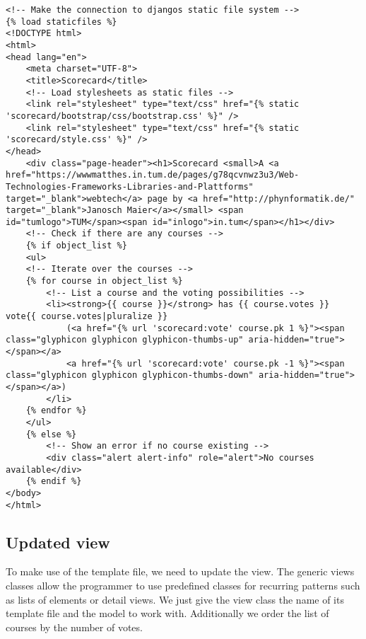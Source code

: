 \begin{lstlisting}[style=HTML, caption=scorecard/templates/scorecard/index.html, label=lst:index.html]
<!-- Make the connection to djangos static file system -->
{% load staticfiles %}
<!DOCTYPE html>
<html>
<head lang="en">
    <meta charset="UTF-8">
    <title>Scorecard</title>
    <!-- Load stylesheets as static files -->
    <link rel="stylesheet" type="text/css" href="{% static 'scorecard/bootstrap/css/bootstrap.css' %}" />
    <link rel="stylesheet" type="text/css" href="{% static 'scorecard/style.css' %}" />
</head>
    <div class="page-header"><h1>Scorecard <small>A <a href="https://wwwmatthes.in.tum.de/pages/g78qcvnwz3u3/Web-Technologies-Frameworks-Libraries-and-Plattforms" target="_blank">webtech</a> page by <a href="http://phynformatik.de/" target="_blank">Janosch Maier</a></small> <span id="tumlogo">TUM</span><span id="inlogo">in.tum</span></h1></div>
    <!-- Check if there are any courses -->
    {% if object_list %}
    <ul>
    <!-- Iterate over the courses -->
    {% for course in object_list %}
        <!-- List a course and the voting possibilities -->
        <li><strong>{{ course }}</strong> has {{ course.votes }} vote{{ course.votes|pluralize }}
            (<a href="{% url 'scorecard:vote' course.pk 1 %}"><span class="glyphicon glyphicon glyphicon-thumbs-up" aria-hidden="true"></span></a>
            <a href="{% url 'scorecard:vote' course.pk -1 %}"><span class="glyphicon glyphicon glyphicon-thumbs-down" aria-hidden="true"></span></a>)
        </li>
    {% endfor %}
    </ul>
    {% else %}
        <!-- Show an error if no course existing -->
        <div class="alert alert-info" role="alert">No courses available</div>
    {% endif %}
</body>
</html>
\end{lstlisting}

\subsection{Updated view}

To make use of the template file, we need to update the view. The generic views classes allow the programmer to use predefined classes for recurring patterns such as lists of elements or detail views. We just give the view class the name of its template file and the model to work with. Additionally we order the list of courses by the number of votes.

